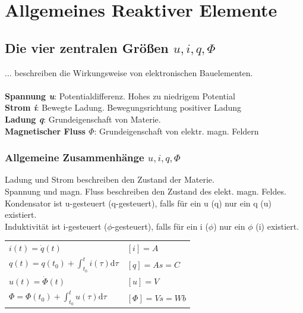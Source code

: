 \documentclass[fs, footer]{latex4ei}
\begin{document}
\begin{multicols*}{4}
\begin{tabular}{ll}
		\end{tabular}


\section{Allgemeines Reaktiver Elemente}

	\subsection{Die vier zentralen Größen $u,i,q,\Phi$}
	... beschreiben die Wirkungsweise von elektronischen Bauelementen.\\ \\
	\textbf{Spannung \textit{u}}: Potentialdifferenz. Hohes zu niedrigem Potential\\
	\textbf{Strom \textit{i}}: Bewegte Ladung. Bewegungsrichtung positiver Ladung\\
	\textbf{Ladung \textit{q}}: Grundeigenschaft von Materie.\\
	\textbf{Magnetischer Fluss \textit{$\Phi$}}: Grundeigenschaft von elektr. magn. Feldern\\
		\subsubsection{Allgemeine Zusammenhänge $u,i,q,\Phi$}
		Ladung und Strom beschreiben den Zustand der Materie.\\
		Spannung und magn. Fluss beschreiben den Zustand des elekt. magn. Feldes.\\
		Kondensator ist u-gesteuert (q-gesteuert), falls für ein u (q) nur ein q (u)  existiert. \\
		Induktivität ist i-gesteuert ($\phi$-gesteuert), falls für ein i ($\phi$) nur ein $\phi$ (i) existiert. \\
		\begin{tabular}{l|l}
			$i(t) = \dot q(t)$ & $[i]=A$\\
			$q(t) = q(t_0) + \int_{t_0}^t i(\tau) \mathrm d\tau$	& $[q]=As=C$ \\ \hline
			$u(t) = \dot \Phi(t)$ & $[u]=V$\\
			$\Phi = \Phi(t_0) + \int_{t_0}^t u(\tau) \mathrm d\tau$ & $[\Phi]=Vs=Wb$ \\
		\end{tabular}





\end{multicols*}
\end{document}

